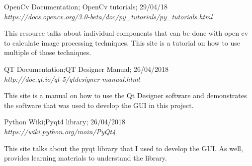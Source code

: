 \documentclass{article}
\begin{document}
\begin{center}
\begin{thebibliography}{9}
	OpenCv Documentation; OpenCv tutorials; 29/04/18 \\ 	
 	
 	\textit{https://docs.opencv.org/3.0-beta/doc/py\_tutorials/py\_tutorials.html}
 	
This resource talks about individual components that can be done with open cv to calculate image processing techniques. This site is a tutorial on how to use multiple of those techniques. \\
    

    QT Documentation;QT Designer Manual; 26/04/2018 \\ 
    
    \textit{http://doc.qt.io/qt-5/qtdesigner-manual.html}
    
    This site is a manual on how to use the Qt Designer software and demonstrates the software that was used to develop the GUI in this project.\\ 
    

    Python Wiki;Pyqt4 library; 26/04/2018 \\ 
    
    \textit{https://wiki.python.org/moin/PyQt4}
    
    This site talks about the pyqt library that I used to develop the GUI. As well, provides learning materials to understand the library.\\ 

    \end{thebibliography}

\end{center}

 
\end{document}
